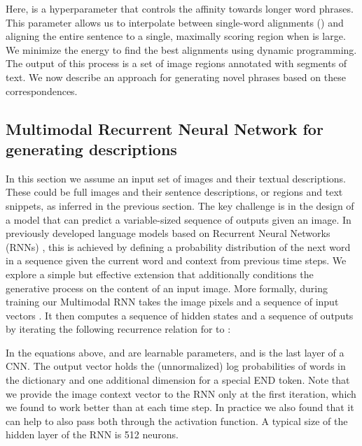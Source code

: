 \documentclass[10pt,twocolumn,letterpaper]{article}
\begin{document}
\vspace{-0.2in}

\vspace{-0.2in}

Here,  is a hyperparameter that controls the affinity towards longer word phrases. This parameter allows us to interpolate between single-word alignments () and aligning the entire sentence to a single, maximally scoring region when  is large. We minimize the energy to find the best alignments  using dynamic programming. The output of this process is a set of image regions annotated with segments of text. We now describe an approach for generating novel phrases based on these correspondences.

\vspace{-0.1in}
\subsection{Multimodal Recurrent Neural Network for generating descriptions}
\label{sec:generate}
\vspace{-0.1in}

In this section we assume an input set of images and their textual descriptions. These could be full images and their sentence descriptions, or regions and text snippets, as inferred in the previous section. The key challenge is in the design of a model that can predict a variable-sized sequence of outputs given an image. In previously developed language models based on Recurrent Neural Networks (RNNs) \cite{mikolov2010recurrent,sutskever2011generating,elman1990finding}, this is achieved by defining a probability distribution of the next word in a sequence given the current word and context from previous time steps. We explore a simple but effective extension that additionally conditions the generative process on the content of an input image. More formally, during training our Multimodal RNN takes the image pixels  and a sequence of input vectors . It then computes a sequence of hidden states  and a sequence of outputs  by iterating the following recurrence relation for  to :

\vspace{-0.3in}

\vspace{-0.3in}

In the equations above,  and  are learnable parameters, and  is the last layer of a CNN. The output vector  holds the (unnormalized) log probabilities of words in the dictionary and one additional dimension for a special END token. Note that we provide the image context vector  to the RNN only at the first iteration, which we found to work better than at each time step. In practice we also found that it can help to also pass both  through the activation function. A typical size of the hidden layer of the RNN is 512 neurons.
\end{document}
